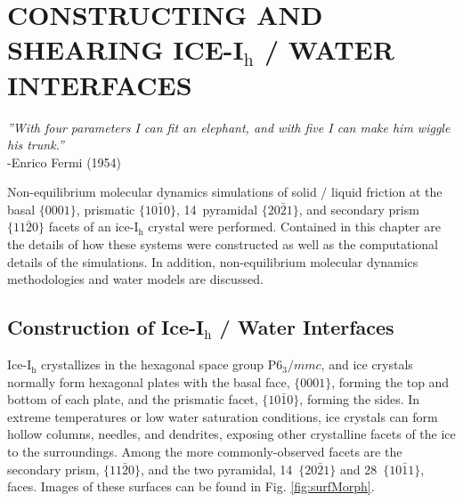 

\chapter{CONSTRUCTING AND SHEARING ICE-I$_\mathrm{h}$ / WATER INTERFACES}

\begin{flushright}
\textit{''With four parameters I can fit an elephant, and with five I
  can make him wiggle his trunk.''} \\
-Enrico Fermi (1954) \\
\end{flushright}


Non-equilibrium molecular dynamics simulations of solid / liquid
friction at the basal $\{0001\}$, prismatic $\{10\bar{1}0\}$,
14\degree~pyramidal $\{20\bar{2}1\}$, and secondary prism
$\{11\bar{2}0\}$ facets of an ice-I$_\mathrm{h}$ crystal were
performed. Contained in this chapter are the details of how these
systems were constructed as well as the computational details
of the simulations. In addition, non-equilibrium molecular dynamics
methodologies and water models are discussed.


\section{Construction of Ice-I$_\mathrm{h}$ / Water Interfaces}

Ice-I$_\mathrm{h}$ crystallizes in the hexagonal space group
P$6_3/mmc$, and ice crystals normally form hexagonal plates with the
basal face, $\{0001\}$, forming the top and bottom of each plate, and
the prismatic facet, $\{10\bar{1}0\}$, forming the sides.  In extreme
temperatures or low water saturation conditions, ice crystals can form
hollow columns, needles, and dendrites, exposing other crystalline
facets of the ice to the surroundings.  Among the more
commonly-observed facets are the secondary prism, $\{11\bar{2}0\}$,
and the two pyramidal, 14\degree~$\{20\bar{2}1\}$ and
28\degree~$\{10\bar{1}1\}$, faces. Images of these surfaces can
be found in Fig. \ref{fig:surfMorph}.


